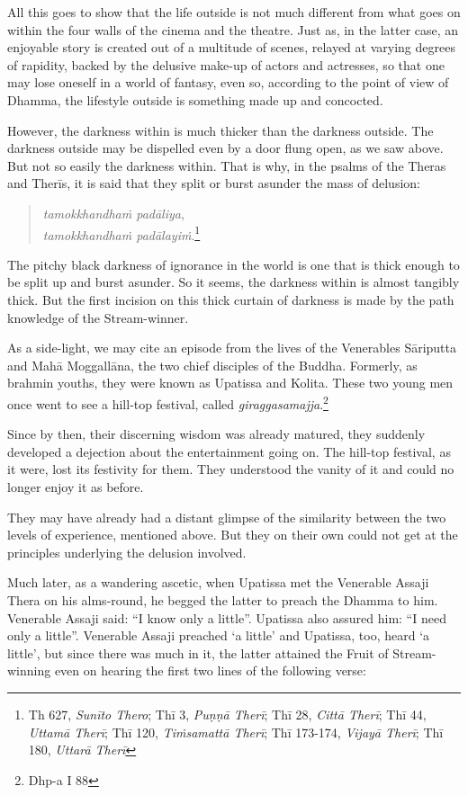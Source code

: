 All this goes to show that the life outside is not much different from what goes on within the four walls of the cinema and the theatre. Just as, in the latter case, an enjoyable story is created out of a multitude of scenes, relayed at varying degrees of rapidity, backed by the delusive make-up of actors and actresses, so that one may lose oneself in a world of fantasy, even so, according to the point of view of Dhamma, the lifestyle outside is something made up and concocted.

However, the darkness within is much thicker than the darkness outside. The darkness outside may be dispelled even by a door flung open, as we saw above. But not so easily the darkness within. That is why, in the psalms of the Theras and Therīs, it is said that they split or burst asunder the mass of delusion:

\begin{quote}
\emph{tamokkhandhaṁ padāliya},\\
\emph{tamokkhandhaṁ padālayiṁ}.\footnote{Th 627, \emph{Sunīto Thero}; Thī 3, \emph{Puṇṇā Therī}; Thī 28, \emph{Cittā Therī}; Thī 44, \emph{Uttamā Therī}; Thī 120, \emph{Tiṁsamattā Therī}; Thī 173-174, \emph{Vijayā Therī}; Thī 180, \emph{Uttarā Therī}}
\end{quote}

The pitchy black darkness of ignorance in the world is one that is thick enough to be split up and burst asunder. So it seems, the darkness within is almost tangibly thick. But the first incision on this thick curtain of darkness is made by the path knowledge of the Stream-winner.

As a side-light, we may cite an episode from the lives of the Venerables Sāriputta and Mahā Moggallāna, the two chief disciples of the Buddha. Formerly, as brahmin youths, they were known as Upatissa and Kolita. These two young men once went to see a hill-top festival, called \emph{giraggasamajja}.\footnote{Dhp-a I 88}

Since by then, their discerning wisdom was already matured, they suddenly developed a dejection about the entertainment going on. The hill-top festival, as it were, lost its festivity for them. They understood the vanity of it and could no longer enjoy it as before.

They may have already had a distant glimpse of the similarity between the two levels of experience, mentioned above. But they on their own could not get at the principles underlying the delusion involved.

Much later, as a wandering ascetic, when Upatissa met the Venerable Assaji Thera on his alms-round, he begged the latter to preach the Dhamma to him. Venerable Assaji said: ``I know only a little''. Upatissa also assured him: ``I need only a little''. Venerable Assaji preached `a little' and Upatissa, too, heard `a little', but since there was much in it, the latter attained the Fruit of Stream-winning even on hearing the first two lines of the following verse:

